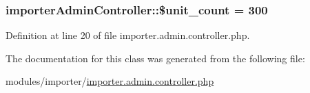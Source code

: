 \subsubsection[{\$unit\+\_\+count}]{\setlength{\rightskip}{0pt plus 5cm}importer\+Admin\+Controller\+::\$unit\+\_\+count = 300}\label{classimporterAdminController_ac425370d30482b23546a0a16da75792c}


Definition at line 20 of file importer.\+admin.\+controller.\+php.



The documentation for this class was generated from the following file\+:\begin{DoxyCompactItemize}
\item 
modules/importer/\hyperlink{importer_8admin_8controller_8php}{importer.\+admin.\+controller.\+php}\end{DoxyCompactItemize}
